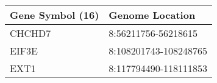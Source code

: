 \begin{tabular}{ll}
\toprule
Gene Symbol (16) &       Genome Location \\
\midrule
          CHCHD7 &   8:56211756-56218615 \\
           EIF3E & 8:108201743-108248765 \\
            EXT1 & 8:117794490-118111853 \\
\bottomrule
\end{tabular}
